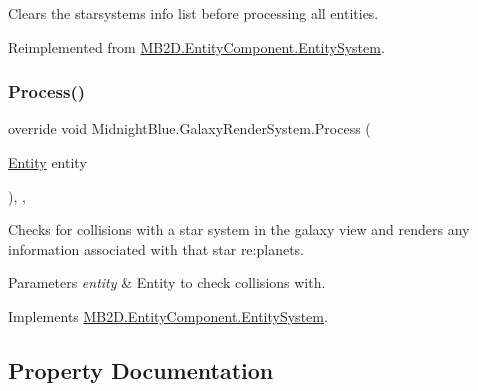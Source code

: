 Clears the starsystems info list before processing all entities. 



Reimplemented from \hyperlink{class_m_b2_d_1_1_entity_component_1_1_entity_system_aadc002dd04d9cb75775ca955a28e303e}{M\+B2\+D.\+Entity\+Component.\+Entity\+System}.

\hypertarget{class_midnight_blue_1_1_galaxy_render_system_aabbf61a4bcfb7c026d2d0c9fbe90569f}{}\label{class_midnight_blue_1_1_galaxy_render_system_aabbf61a4bcfb7c026d2d0c9fbe90569f} 
\subsubsection{\texorpdfstring{Process()}{Process()}}
{\footnotesize\ttfamily override void Midnight\+Blue.\+Galaxy\+Render\+System.\+Process (\begin{DoxyParamCaption}\item[{\hyperlink{class_m_b2_d_1_1_entity_component_1_1_entity}{Entity}}]{entity }\end{DoxyParamCaption})\hspace{0.3cm}{\ttfamily [inline]}, {\ttfamily [protected]}, {\ttfamily [virtual]}}



Checks for collisions with a star system in the galaxy view and renders any information associated with that star re\+:planets. 


\begin{DoxyParams}{Parameters}
{\em entity} & Entity to check collisions with.\\
\hline
\end{DoxyParams}


Implements \hyperlink{class_m_b2_d_1_1_entity_component_1_1_entity_system_abbf83b87cb5d12754fb058cef50451fa}{M\+B2\+D.\+Entity\+Component.\+Entity\+System}.



\subsection{Property Documentation}
\hypertarget{class_midnight_blue_1_1_galaxy_render_system_a2f252c64ec38b5bcf20c6b276fd5809b}{}\label{class_midnight_blue_1_1_galaxy_render_system_a2f252c64ec38b5bcf20c6b276fd5809b} 
